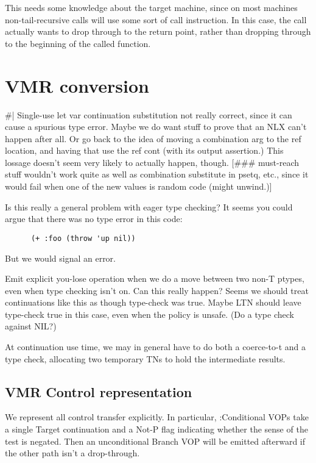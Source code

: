 This needs some knowledge about the target machine, since on most machines
non-tail-recursive calls will use some sort of call instruction.  In this case,
the call actually wants to drop through to the return point, rather than
dropping through to the beginning of the called function.


\chapter{VMR conversion}

\#|
Single-use let var continuation substitution not really correct, since it can
cause a spurious type error.  Maybe we do want stuff to prove that an NLX can't
happen after all.  Or go back to the idea of moving a combination arg to the
ref location, and having that use the ref cont (with its output assertion.)
This lossage doesn't seem very likely to actually happen, though.
[\#\#\# must-reach stuff wouldn't work quite as well as combination substitute in
psetq, etc., since it would fail when one of the new values is random code
(might unwind.)]

Is this really a general problem with eager type checking?  It seems you could
argue that there was no type error in this code:

\begin{verbatim}
      (+ :foo (throw 'up nil))
\end{verbatim}

But we would signal an error.


Emit explicit you-lose operation when we do a move between two non-T ptypes,
even when type checking isn't on.  Can this really happen?  Seems we should
treat continuations like this as though type-check was true.  Maybe LTN should
leave type-check true in this case, even when the policy is unsafe.  (Do a type
check against NIL?)

At continuation use time, we may in general have to do both a coerce-to-t and a
type check, allocating two temporary TNs to hold the intermediate results.


\section{VMR Control representation}

We represent all control transfer explicitly.  In particular, :Conditional VOPs
take a single Target continuation and a Not-P flag indicating whether the sense
of the test is negated.  Then an unconditional Branch VOP will be emitted
afterward if the other path isn't a drop-through.

